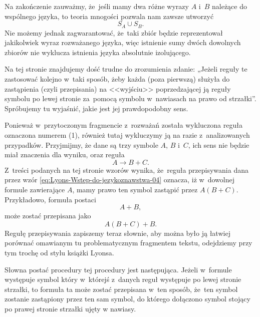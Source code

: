 \documentclass[a4paper,11pt]{article}
\begin{document}
Na zakończenie zauważmy, że~jeśli mamy dwa różne wyrazy $A$ i~$B$ należące
do wspólnego języka, to teoria mnogości pozwala nam zawsze utworzyć
\begin{equation}
  \label{eq:Lyons-Wstep-do-jezykoznawstwa-03}
  S_{ A } \cup S_{ B }.
\end{equation}
Nie możemy jednak zagwarantować, że~taki zbiór będzie reprezentował
jakikolwiek wyraz rozważanego języka, więc istnienie sumy dwóch dowolnych
zbiorów nie wyklucza istnienia języka absolutnie izolującego.

\vspace{\spaceFour}





\start {} Na tej stronie znajdujemy dość trudne do zrozumienia
zdanie: „Jeżeli reguły te zastosować kolejno w~taki sposób, żeby każda (poza
pierwszą) służyła do zastąpienia (czyli przepisania) na <<wyjściu>>
poprzedzającej ją reguły symbolu po lewej stronie za~pomocą symbolu
w~nawiasach na prawo od strzałki”. Spróbujemy tu wyjaśnić, jakie jest jej
prawdopodobny sens.

Ponieważ w~przytoczonym fragmencie z~rozważań została wykluczona reguła
oznaczona numerem (1), również tutaj wykluczymy ją na razie z~analizowanych
przypadków. Przyjmijmy, że dane są trzy symbole $A$, $B$ i~$C$, ich sens nie
będzie miał znaczenia dla wyniku, oraz reguła
\begin{equation}
  \label{eq:Lyons-Wstep-do-jezykoznawstwa-04}
  A \to B + C.
\end{equation}
Z~treści podanych na tej stronie wzorów wynika, że~reguła przepisywania dana
przez wzór \eqref{eq:Lyons-Wstep-do-jezykoznawstwa-04} oznacza, iż
w~dowolnej formule zawierające $A$, mamy prawo ten symbol zastąpić przez
$A( B + C )$. Przykładowo, formuła postaci
\begin{equation}
  \label{eq:Lyons-Wstep-do-jezykoznawstwa-05}
  A + B,
\end{equation}
może zostać przepisana jako
\begin{equation}
  \label{eq:Lyons-Wstep-do-jezykoznawstwa-06}
  A( B + C ) + B.
\end{equation}
Regułę przepisywania zapiszemy teraz słownie, aby można było ją łatwiej
porównać omawianym tu problematycznym fragmentem tekstu, odejdziemy przy tym
trochę od stylu książki Lyonsa.

Słowna postać procedury tej procedury jest następująca. Jeżeli w~formule
występuje symbol który w~którejś z~danych reguł występuje po lewej stronie
strzałki, to formuła ta może zostać przepisana w~ten sposób, że~ten symbol
zostanie zastąpiony przez ten sam symbol, do którego dołączono symbol
stojący po prawej stronie strzałki ujęty w nawiasy.
\end{document}
